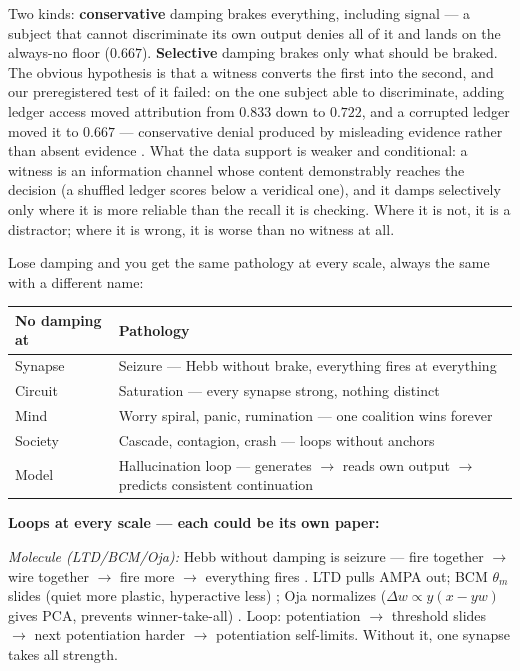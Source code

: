 \documentclass[11pt]{article}
\begin{document}
Two kinds: \textbf{conservative} damping brakes everything, including
signal --- a subject that cannot discriminate its own output denies all of
it and lands on the always-no floor ($0.667$). \textbf{Selective} damping
brakes only what should be braked. The obvious hypothesis is that a witness
converts the first into the second, and our preregistered test of it failed:
on the one subject able to discriminate, adding ledger access moved
attribution from $0.833$ down to $0.722$, and a corrupted ledger moved it to
$0.667$ --- conservative denial produced by misleading evidence rather than
absent evidence \citep{panickssery2024,macar2026}. What the data support is
weaker and conditional: a witness is an information channel whose content
demonstrably reaches the decision (a shuffled ledger scores below a
veridical one), and it damps selectively only where it is more reliable than
the recall it is checking. Where it is not, it is a distractor; where it is
wrong, it is worse than no witness at all.

Lose damping and you get the same pathology at every scale, always the same with a different name:

\begin{center}
\small
\begin{tabular}{p{2.6cm}p{6.5cm}}
\toprule
No damping at & Pathology \\
\midrule
Synapse & Seizure --- Hebb without brake, everything fires at everything \\
Circuit & Saturation --- every synapse strong, nothing distinct \\
Mind & Worry spiral, panic, rumination --- one coalition wins forever \\
Society & Cascade, contagion, crash --- loops without anchors \\
Model & Hallucination loop --- generates $\to$\allowbreak{} reads own output $\to$\allowbreak{} predicts consistent continuation \\
\bottomrule
\end{tabular}
\end{center}

\textbf{Loops at every scale --- each could be its own paper:}

\textit{Molecule (LTD/BCM/Oja):} Hebb without damping is seizure --- fire together $\to$\allowbreak{} wire together $\to$\allowbreak{} fire more $\to$\allowbreak{} everything fires \citep{tononi2014}. LTD pulls AMPA out; BCM $\theta_m$ slides (quiet more plastic, hyperactive less) \citep{bienenstock1982}; Oja normalizes ($\Delta w \propto y(x - yw)$ gives PCA, prevents winner-take-all) \citep{oja1982}. Loop: potentiation $\to$\allowbreak{} threshold slides $\to$\allowbreak{} next potentiation harder $\to$\allowbreak{} potentiation self-limits. Without it, one synapse takes all strength.
\end{document}
